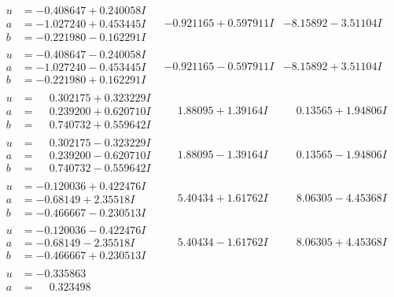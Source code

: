 \documentclass[1p]{elsarticle_modified}
\theoremstyle{definition}
\begin{document}
$$\begin{array}{c|c|c}
 \hline 
\begin{aligned}
u &= -0.408647 + 0.240058 I \\
a &= -1.027240 + 0.453445 I \\
b &= -0.221980 - 0.162291 I\end{aligned}
 & -0.921165 + 0.597911 I & -8.15892 - 3.51104 I \\ \hline\begin{aligned}
u &= -0.408647 - 0.240058 I \\
a &= -1.027240 - 0.453445 I \\
b &= -0.221980 + 0.162291 I\end{aligned}
 & -0.921165 - 0.597911 I & -8.15892 + 3.51104 I \\ \hline\begin{aligned}
u &= \phantom{-}0.302175 + 0.323229 I \\
a &= \phantom{-}0.239200 + 0.620710 I \\
b &= \phantom{-}0.740732 + 0.559642 I\end{aligned}
 & \phantom{-}1.88095 + 1.39164 I & \phantom{-}0.13565 + 1.94806 I \\ \hline\begin{aligned}
u &= \phantom{-}0.302175 - 0.323229 I \\
a &= \phantom{-}0.239200 - 0.620710 I \\
b &= \phantom{-}0.740732 - 0.559642 I\end{aligned}
 & \phantom{-}1.88095 - 1.39164 I & \phantom{-}0.13565 - 1.94806 I \\ \hline\begin{aligned}
u &= -0.120036 + 0.422476 I \\
a &= -0.68149 + 2.35518 I \\
b &= -0.466667 - 0.230513 I\end{aligned}
 & \phantom{-}5.40434 + 1.61762 I & \phantom{-}8.06305 - 4.45368 I \\ \hline\begin{aligned}
u &= -0.120036 - 0.422476 I \\
a &= -0.68149 - 2.35518 I \\
b &= -0.466667 + 0.230513 I\end{aligned}
 & \phantom{-}5.40434 - 1.61762 I & \phantom{-}8.06305 + 4.45368 I \\ \hline\begin{aligned}
u &= -0.335863\phantom{ +0.000000I} \\
a &= \phantom{-}0.323498\phantom{ +0.000000I} \\

\end{aligned}
\end{array}$$
\end{document}
